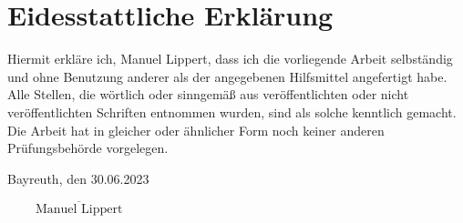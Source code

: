 \newpage
\chapter*{Eidesstattliche Erklärung}
\label{sec:eid}
\thispagestyle{empty}

\vspace*{0.1cm}
Hiermit erkläre ich, Manuel Lippert, dass ich die vorliegende Arbeit selbständig und ohne Benutzung anderer als der angegebenen Hilfsmittel angefertigt habe.
\bigskip
Alle Stellen, die wörtlich oder sinngemäß aus veröffentlichten oder nicht veröffentlichten Schriften entnommen wurden, sind als solche kenntlich gemacht.
\bigskip
Die Arbeit hat in gleicher oder ähnlicher Form noch keiner anderen Prüfungsbehörde vorgelegen.
\vspace{3cm}

\noindent Bayreuth, den 30.06.2023
\begin{flushright}
$\overline{~~~~~~~~~~\mbox{Manuel Lippert}~~~~~~~~~~}$
\end{flushright}